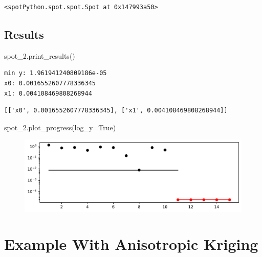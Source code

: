 \documentclass[
  letterpaper,
  DIV=11,
  numbers=noendperiod]{scrreprt}
\newenvironment{Shaded}{\begin{snugshade}}{\end{snugshade}}
\newcommand{\NormalTok}[1]{\textcolor[rgb]{0.00,0.23,0.31}{#1}}
\newcommand{\OperatorTok}[1]{\textcolor[rgb]{0.37,0.37,0.37}{#1}}
\newcommand{\VariableTok}[1]{\textcolor[rgb]{0.07,0.07,0.07}{#1}}
\begin{document}
\begin{verbatim}
<spotPython.spot.spot.Spot at 0x147993a50>
\end{verbatim}

\hypertarget{results-1}{%
\subsection{Results}\label{results-1}}

\begin{Shaded}
\begin{Highlighting}[]
\NormalTok{spot\_2.print\_results()}
\end{Highlighting}
\end{Shaded}

\begin{verbatim}
min y: 1.961941240809186e-05
x0: 0.0016552607778336345
x1: 0.004108469808268944
\end{verbatim}

\begin{verbatim}
[['x0', 0.0016552607778336345], ['x1', 0.004108469808268944]]
\end{verbatim}

\begin{Shaded}
\begin{Highlighting}[]
\NormalTok{spot\_2.plot\_progress(log\_y}\OperatorTok{=}\VariableTok{True}\NormalTok{)}
\end{Highlighting}
\end{Shaded}

\begin{figure}[H]

{\centering \includegraphics{009_num_spot_anisotropic_files/figure-pdf/cell-6-output-1.pdf}

}

\end{figure}

\hypertarget{example-with-anisotropic-kriging}{%
\section{Example With Anisotropic
Kriging}\label{example-with-anisotropic-kriging}}
\end{document}
